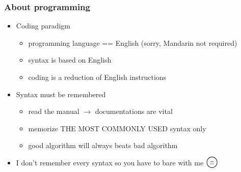 \begin{frame}[fragile]
\frametitle{About programming}
\begin{itemize}
\item Coding paradigm
	\begin{itemize}
	\item programming language == English (sorry, Mandarin not required)
	\item syntax is based on English
	\item coding is a reduction of English instructions
	\end{itemize}

\item Syntax must be remembered
	\begin{itemize}
	\item read the manual $\longrightarrow$ documentations are vital
	\item memorize THE MOST COMMONLY USED syntax only
	\item good algorithm will always beats bad algorithm
	\end{itemize}		

\item I don't remember every syntax so you have to bare with me $\LARGE \pfbox$

\end{itemize}

\end{frame}